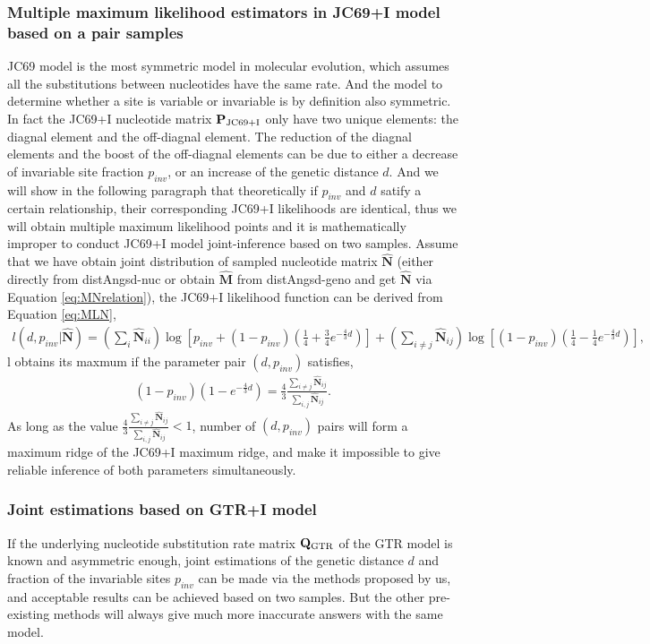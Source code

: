\documentclass{article}
\begin{document}
\subsubsection{Multiple maximum likelihood estimators in JC69+I model based on a pair samples}
JC69 model is the most symmetric model in molecular evolution, which assumes all the substitutions between nucleotides have the same rate. And the model to determine whether a site is variable or invariable is by definition also symmetric. In fact the JC69+I nucleotide matrix ${\bf P}_{\mathrm{JC69+I}}$ only have two unique elements: the diagnal element and the off-diagnal element. The reduction of the diagnal elements and the boost of the off-diagnal elements can be due to either a decrease of invariable site fraction $p_{inv}$, or an increase of the genetic distance $d$. And we will show in the following paragraph that theoretically if $p_{inv}$ and $d$ satify a certain relationship, their corresponding JC69+I likelihoods are identical, thus we will obtain multiple maximum likelihood points and it is mathematically improper to conduct JC69+I model joint-inference based on two samples. Assume that we have obtain joint distribution of sampled nucleotide matrix $\mathbf{\hat{N}}$ (either directly from distAngsd-nuc or obtain $\mathbf{\hat{M}}$ from distAngsd-geno and get $\mathbf{\hat{N}}$ via Equation \ref{eq:MNrelation}), the JC69+I likelihood function can be derived from Equation \ref{eq:MLN},
\begin{align*}
l(d,p_{inv}|\mathbf{\hat{N}})=\left(\sum_{i}\mathbf{\hat{N}}_{ii}\right)\log\left[p_{inv}+\left(1-p_{inv}\right)\left(\frac{1}{4}+\frac{3}{4}e^{-\frac{4}{3}d}\right)\right]+\left(\sum_{i\neq j}\mathbf{\hat{N}}_{ij}\right)\log\left[\left(1-p_{inv}\right)\left(\frac{1}{4}-\frac{1}{4}e^{-\frac{4}{3}d}\right)\right],
\end{align*}
l obtains its maxmum if the parameter pair $(d,p_{inv})$ satisfies,
\begin{align*}
    \left(1-p_{inv}\right)\left(1-e^{-\frac{4}{3}d}\right)=\frac{4}{3}\frac{\sum_{i\neq j}\mathbf{\hat{N}}_{ij}}{\sum_{i,j}\mathbf{\hat{N}}_{ij}}.
\end{align*}
As long as the value $\frac{4}{3}\frac{\sum_{i\neq j}\mathbf{\hat{N}}_{ij}}{\sum_{i,j}\mathbf{\hat{N}}_{ij}}<1$, number of $(d,p_{inv})$ pairs will form a maximum ridge of the JC69+I maximum ridge, and make it impossible to give reliable inference of both parameters simultaneously.
\subsubsection{Joint estimations based on GTR+I model}
If the underlying nucleotide substitution rate matrix ${\bf Q}_{\mathrm{GTR}}$ of the GTR model is known and asymmetric enough, joint estimations of the genetic distance $d$ and fraction of the invariable sites $p_{inv}$ can be made via the methods proposed by us, and acceptable results can be achieved based on two samples. But the other pre-existing methods will always give much more inaccurate answers with the same model.
\end{document}

